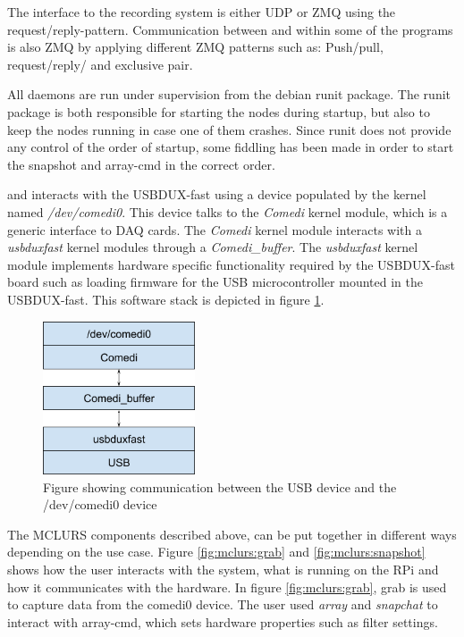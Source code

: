 
The interface to the recording system is either UDP or ZMQ using the request/reply-pattern. Communication  between and within some of the programs is also ZMQ by applying different ZMQ patterns such as: Push/pull, request/reply/ and exclusive pair.

All daemons are run under supervision from the debian runit package. The runit package is both responsible for starting the nodes during startup, but also to keep the nodes running in case one of them crashes. Since runit does not provide any control of the order of startup, some fiddling has been made in order to start the snapshot and array-cmd in the correct order. 


 \label{sec:existingsystem:software:kernelmodule}
 and  interacts with the USBDUX-fast using a device populated by the kernel named \textit{/dev/comedi0}.
This device talks to the \textit{Comedi} kernel module, which is a generic interface to \ac{DAQ} cards. The  \textit{Comedi} kernel module interacts with a \textit{usbduxfast} kernel modules through a \textit{Comedi\_buffer}.
The \textit{usbduxfast} kernel module implements hardware specific functionality required by the USBDUX-fast board such as loading firmware for the USB microcontroller mounted in the USBDUX-fast.
This software stack is depicted in figure \ref{fig:existingsystem:kernel}.

\begin{figure}[H]
	\centering
	\includegraphics[width=0.4\textwidth]{figures/mclurs_comedi}
	\caption{Figure showing communication between the USB device and the /dev/comedi0 device}
	\label{fig:existingsystem:kernel}
\end{figure}

 \label{sc:existingsystem:setup}
The MCLURS components described above, can be put together in different ways depending on the use case. Figure \ref{fig:mclurs:grab} and \ref{fig:mclurs:snapshot} shows how the user interacts with the system, what is running on the \ac{RPi} and how it communicates with the hardware. In figure \ref{fig:mclurs:grab}, grab is used to capture data from the comedi0 device. The user used \textit{array} and \textit{snapchat} to interact with array-cmd, which sets hardware properties such as filter settings.

